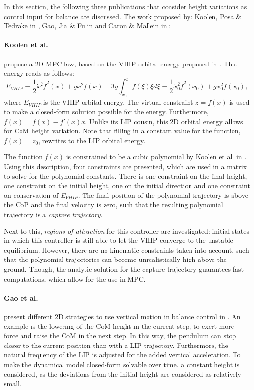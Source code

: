 In this section, the following three publications that consider height variations as control input for balance are discussed. The work proposed by: Koolen, Posa \& Tedrake in \cite{koolen2016balance},  Gao, Jia \& Fu in \cite{gao2017increase} and  Caron \& Mallein in \cite{caron2018balance}:

\paragraph{Koolen et al.} propose a \ac{2D} \ac{MPC} law, based on the \ac{VHIP} orbital energy proposed in \cite{pratt2007derivation}. This energy reads as follows:
\begin{equation}\label{eq:evhip}
    E_{VHIP}  = \frac{1}{2}\dot{x}^2\bar{f}^2(x)+gx^2f(x) - 3g\int_{x_0}^xf(\xi)\xi d\xi = \frac{1}{2}\dot{x}_0^2\bar{f}^2(x_0)+gx_0^2f(x_0),
\end{equation}
where $E_{VHIP}$ is the \ac{VHIP} orbital energy. The virtual constraint $z=f(x)$ is used to make a closed-form solution possible for the energy. Furthermore, $\bar{f}(x)=f(x)-f'(x)x$. Unlike its \ac{LIP} cousin, this \ac{2D} orbital energy allows for \ac{CoM} height variation. Note that filling in a constant value for the function, $f(x)=z_0$, rewrites to the \ac{LIP} orbital energy.

The function $f(x)$ is constrained to be a cubic polynomial by Koolen et al. in \cite{koolen2016balance}. Using this description, four constraints are presented, which are used in a matrix to solve for the polynomial constants. There is one constraint on the final height, one constraint on the initial height, one on the initial direction and one constraint on conservation of $E_{VHIP}$. The final position of the polynomial trajectory is above the \ac{CoP} and the final velocity is zero, such that the resulting polynomial trajectory is a \textit{capture trajectory}. 

Next to this, \textit{regions of attraction} for this controller are investigated: initial states in which this controller is still able to let the \ac{VHIP} converge to the unstable equilibrium. However, there are no kinematic constraints taken into account, such that the polynomial trajectories can become unrealistically high above the ground. Though, the analytic solution for the capture trajectory guarantees fast computations, which allow for the use in \ac{MPC}.

\paragraph{Gao et al.} present different \ac{2D} strategies to use vertical motion in balance control in \cite{gao2017increase}. An example is the lowering of the \ac{CoM} height in the current step, to exert more force and raise the \ac{CoM} in the next step. In this way, the pendulum can stop closer to the current position than with a \ac{LIP} trajectory. Furthermore, the natural frequency of the \ac{LIP} is adjusted for the added vertical acceleration. To make the dynamical model closed-form solvable over time, a constant height is considered, as the deviations from the initial height are considered as relatively small.

